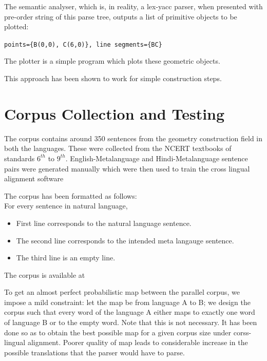 \def\DevnagVersion{2.15}\documentclass[12pt]{article}
\begin{document}
The semantic analyser, which is, in reality, a lex-yacc parser, when presented with pre-order string of this parse tree, outputs a list of primitive objects to be plotted:

\texttt{points=\{B(0,0), C(6,0)\}, line segments=\{BC\}}

The plotter is a simple program which plots these geometric objects.

This approach has been shown to work for simple construction steps.

\section{Corpus Collection and Testing}

The corpus contains around 350 sentences from the geometry construction field in both the languages. These were collected from the NCERT textbooks of standards ${6^{th}}$ to ${9^{th}}$. English-Metalanguage and Hindi-Metalanguage sentence pairs were generated manually which were then used to train the cross lingual alignment software

The corpus has been formatted as follows:\\
For every sentence in natural language, 
\begin{itemize}
\item First line corresponds to the natural language sentence.
\item The second line corresponds to the intended meta langauge sentence.
\item The third line is an empty line.
\end{itemize}
The corpus is available at \cite{corpus}

To get an almost perfect probabilistic map between the parallel corpus, we impose a mild constraint: let the map be from language A to B; we design the corpus such that every word of the language A either maps to exactly one word of language B or to the empty word. Note that this is not necessary. It has been done so as to obtain the best possible map for a given corpus size under corss-lingual alignment. Poorer quality of map leads to considerable increase in the possible translations that the parser would have to parse.
\end{document}
